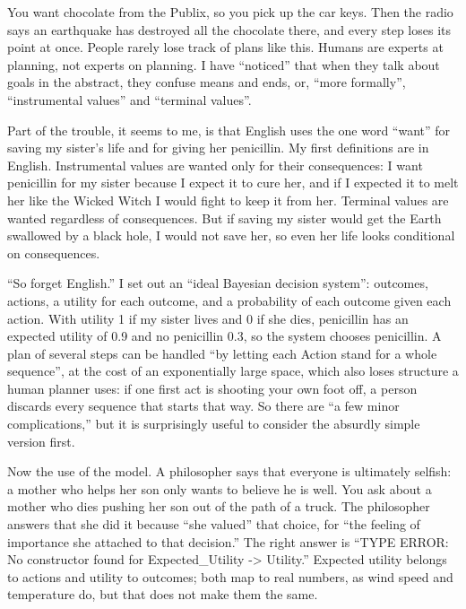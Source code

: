 
You want chocolate from the Publix, so you pick up the car keys. Then the radio says an earthquake has destroyed all the chocolate there, and every step loses its point at once. People rarely lose track of plans like this. Humans are experts at planning, not experts on planning. I have ``noticed'' that when they talk about goals in the abstract, they confuse means and ends, or, ``more formally'', ``instrumental values'' and ``terminal values''. 

Part of the trouble, it seems to me, is that English uses the one word ``want'' for saving my sister's life and for giving her penicillin. My first definitions are in English. Instrumental values are wanted only for their consequences: I want penicillin for my sister because I expect it to cure her, and if I expected it to melt her like the Wicked Witch I would fight to keep it from her. Terminal values are wanted regardless of consequences. But if saving my sister would get the Earth swallowed by a black hole, I would not save her, so even her life looks conditional on consequences.

``So forget English.'' I set out an ``ideal Bayesian decision system'': outcomes, actions, a utility for each outcome, and a probability of each outcome given each action. With utility 1 if my sister lives and 0 if she dies, penicillin has an expected utility of 0.9 and no penicillin 0.3, so the system chooses penicillin. A plan of several steps can be handled ``by letting each Action stand for a whole sequence'', at the cost of an exponentially large space, which also loses structure a human planner uses: if one first act is shooting your own foot off, a person discards every sequence that starts that way. So there are ``a few minor complications,'' but it is surprisingly useful to consider the absurdly simple version first. 

Now the use of the model. A philosopher says that everyone is ultimately selfish: a mother who helps her son only wants to believe he is well. You ask about a mother who dies pushing her son out of the path of a truck. The philosopher answers that she did it because ``she valued'' that choice, for ``the feeling of importance she attached to that decision.'' The right answer is ``TYPE ERROR: No constructor found for Expected\_Utility -> Utility.'' Expected utility belongs to actions and utility to outcomes; both map to real numbers, as wind speed and temperature do, but that does not make them the same.

